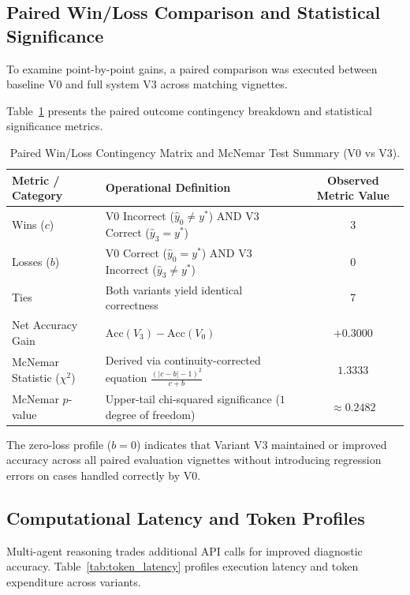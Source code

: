 \subsection{Paired Win/Loss Comparison and Statistical Significance}

To examine point-by-point gains, a paired comparison was executed between baseline V0 and full system V3 across matching vignettes.

Table~\ref{tab:mcnemar_results} presents the paired outcome contingency breakdown and statistical significance metrics.

\begin{table}[h!]
\centering
\caption{Paired Win/Loss Contingency Matrix and McNemar Test Summary (V0 vs V3).}
\label{tab:mcnemar_results}
\small
\begin{tabularx}{\textwidth}{l X c}
\toprule
\textbf{Metric / Category} & \textbf{Operational Definition} & \textbf{Observed Metric Value} \\
\midrule
Wins ($c$) & V0 Incorrect ($\hat{y}_0 \neq y^*$) AND V3 Correct ($\hat{y}_3 = y^*$) & 3 \\
Losses ($b$) & V0 Correct ($\hat{y}_0 = y^*$) AND V3 Incorrect ($\hat{y}_3 \neq y^*$) & 0 \\
Ties & Both variants yield identical correctness & 7 \\
Net Accuracy Gain & $\text{Acc}(V_3) - \text{Acc}(V_0)$ & $+0.3000$ \\
McNemar Statistic ($\chi^2$) & Derived via continuity-corrected equation $\frac{(|c-b|-1)^2}{c+b}$ & $1.3333$ \\
McNemar $p$-value & Upper-tail chi-squared significance ($1$ degree of freedom) & $\approx 0.2482$ \\
\bottomrule
\end{tabularx}
\end{table}

The zero-loss profile ($b=0$) indicates that Variant V3 maintained or improved accuracy across all paired evaluation vignettes without introducing regression errors on cases handled correctly by V0.

\subsection{Computational Latency and Token Profiles}

Multi-agent reasoning trades additional API calls for improved diagnostic accuracy. Table~\ref{tab:token_latency} profiles execution latency and token expenditure across variants.

